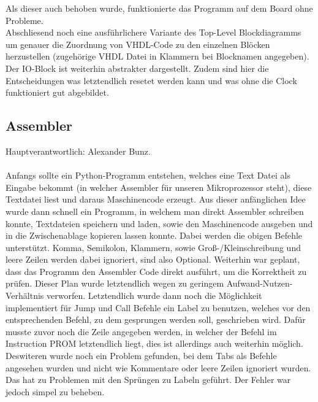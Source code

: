 \documentclass[bibliography=totoc,listof=totoc,index=totoc]{scrartcl}
\begin{document}
Als dieser auch behoben wurde, funktionierte das Programm auf dem Board ohne Probleme. \\
Abschliesend noch eine ausführlichere Variante des Top-Level Blockdiagramms um genauer die Zuordnung von VHDL-Code zu den einzelnen Blöcken herzustellen (zugehörige VHDL Datei in Klammern bei Blocknamen angegeben). Der IO-Block ist weiterhin abstrakter dargestellt. Zudem sind hier die Entscheidungen was letztendlich resetet werden kann und was ohne die Clock funktioniert gut abgebildet.

\subsection{Assembler}
Hauptverantwortlich: Alexander Bunz.\\\\
Anfangs sollte ein Python-Programm entstehen, welches eine Text Datei als Eingabe bekommt (in welcher Assembler
für unseren Mikroprozessor steht), diese Textdatei liest und daraus Maschinencode erzeugt.
Aus dieser anfänglichen Idee wurde dann schnell ein Programm, in welchem man direkt Assembler schreiben
konnte, Textdateien speichern und laden, sowie den Maschinencode ausgeben und in die Zwischenablage 
kopieren lassen konnte. Dabei werden die obigen Befehle unterstützt.
Komma, Semikolon, Klammern, sowie Groß-/Kleinschreibung und leere Zeilen werden dabei ignoriert, sind also Optional. Weiterhin war geplant, dass das Programm den Assembler Code direkt ausführt, um die Korrektheit zu prüfen. Dieser Plan wurde letztendlich wegen zu geringem Aufwand-Nutzen-Verhältnis verworfen.
Letztendlich wurde dann noch die Möglichkeit implementiert für Jump und Call Befehle ein Label zu
benutzen, welches vor den entsprechenden Befehl, zu dem gesprungen werden soll, geschrieben wird.
Dafür musste zuvor noch die Zeile angegeben werden, in welcher der Befehl im Instruction PROM
letztendlich liegt, dies ist allerdings auch weiterhin möglich. Deswiteren wurde noch ein Problem gefunden,
bei dem Tabs als Befehle angesehen wurden und nicht wie Kommentare oder leere Zeilen ignoriert wurden.
Das hat zu Problemen mit den Sprüngen zu Labeln geführt. Der Fehler war jedoch simpel zu beheben.
\end{document}
